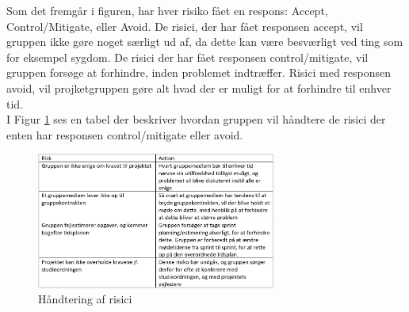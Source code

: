 Som det fremgår i figuren, har hver risiko fået en respons: Accept, Control/Mitigate, eller Avoid. De risici, der har fået responsen accept, vil gruppen ikke gøre
noget særligt ud af, da dette kan være besværligt ved ting som for eksempel sygdom. De risici der har fået responsen control/mitigate, vil gruppen forsøge at forhindre,
inden problemet indtræffer. Risici med responsen avoid, vil projketgruppen gøre alt hvad der er muligt for at forhindre til enhver tid. \\

I Figur \ref{fig:riskmanagement} ses en tabel der beskriver hvordan gruppen vil håndtere de risici der enten har responsen control/mitigate eller avoid.

\begin{figure}[H]
    \centering
    \includegraphics[width=0.7\textwidth]{figures/RiskAction.png}
    \caption{Håndtering af risici}
    \label{fig:riskmanagement}
\end{figure}